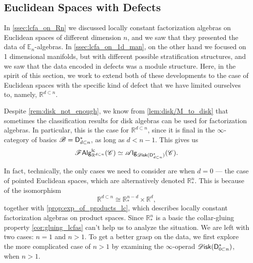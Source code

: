 \documentclass[../text]{subfiles}
\begin{document}
\subsection{Euclidean Spaces with Defects}


In \cref{ssec:lcfa_on_Rn} we discussed locally constant factorization algebras on Euclidean spaces of different dimension $n$, and we saw that they presented the data of $\mathbb{E}_n$-algebras. In \cref{ssec:lcfa_on_1d_man}, on the other hand we focused on 1 dimensional manifolds, but with different possible stratification structures, and we saw that the data encoded in defects was a module structure. Here, in the spirit of this section, we work to extend both of these developments to the case of Euclidean spaces with the specific kind of defect that we have limited ourselves to, namely, $\mathbb{R}^{d \subset n}$.

Despite \cref{rem:disk_not_enough}, we know from \cref{lem:disk/M_to_disk} that sometimes the classification results for disk algebras can be used for factorization algebras. In particular, this is the case for $\mathbb{R}^{d \subset n}$, since it is final in the $\infty$-category of basics $\mathscr{B} = \mathsf{D}_{d \subset n}^*$, as long as $d < n - 1$. This gives us
%
\begin{equation}\label{eq:focus_on_disk_dn}
    \lcfa_{\mathbb{R}^{d \subset n}} (\catC) \simeq \alg{\disk (\mathsf{D}_{d \subset n}^*)} (\catC).
\end{equation}

In fact, technically, the only cases we need to consider are when $d=0$ --- the case of pointed Euclidean spaces, which are alternatively denoted $\mathbb{R}^n_*$. This is because of the isomorphism
%
\begin{equation}
    \mathbb{R}^{d \subset n} \cong \mathbb{R}^{n-d}_* \times \mathbb{R}^d,
\end{equation}
%
together with \cref{prop:exp_of_products_lc}, which describes locally constant factorization algebras on product spaces. Since $\mathbb{R}^n_*$ is a basic the collar-gluing property \cref{cor:gluing_lcfas} can't help us to analyze the situation. We are left with two cases: $n=1$ and $n > 1$. To get a better grasp on the data, we first explore the more complicated case of $n > 1$ by examining the $\infty$-operad $\disk(\mathsf{D}_{0 \subset n}^*)$, when $n > 1$. 
\end{document}
